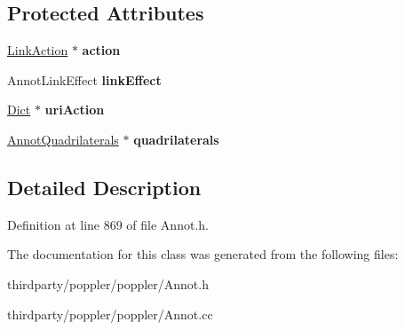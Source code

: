 \subsection*{Protected Attributes}
\begin{DoxyCompactItemize}
\item 
\mbox{\label{class_annot_link_a44fce9b4b5dc06dfad45e6ac1b0feb52}} 
\hyperlink{class_link_action}{Link\+Action} $\ast$ {\bfseries action}
\item 
\mbox{\label{class_annot_link_ad4268f98f0f62220f80442adee9490df}} 
Annot\+Link\+Effect {\bfseries link\+Effect}
\item 
\mbox{\label{class_annot_link_a79cecb413f0a8d3bd536a1ee7a3fb864}} 
\hyperlink{class_dict}{Dict} $\ast$ {\bfseries uri\+Action}
\item 
\mbox{\label{class_annot_link_ac2e3b3e98d89af5ba9a242d48c87d70d}} 
\hyperlink{class_annot_quadrilaterals}{Annot\+Quadrilaterals} $\ast$ {\bfseries quadrilaterals}
\end{DoxyCompactItemize}


\subsection{Detailed Description}


Definition at line 869 of file Annot.\+h.



The documentation for this class was generated from the following files\+:\begin{DoxyCompactItemize}
\item 
thirdparty/poppler/poppler/Annot.\+h\item 
thirdparty/poppler/poppler/Annot.\+cc\end{DoxyCompactItemize}
